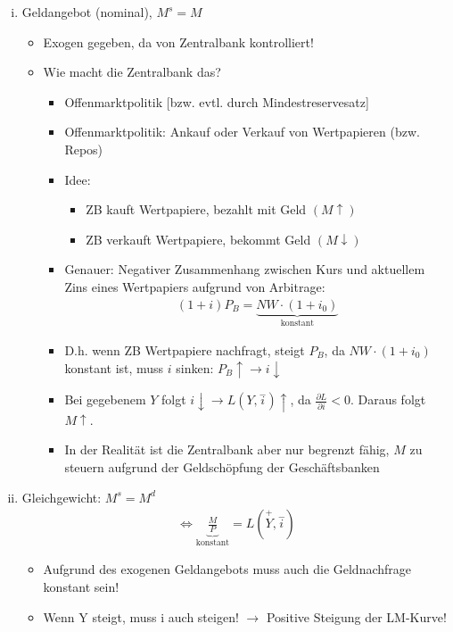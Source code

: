 \documentclass{scrartcl}
\begin{document}
\begin{enumerate}[(a)]
\begin{enumerate}[(i)]
    \item Geldangebot (nominal), $M^s=M$
    \begin{itemize}
      \item Exogen gegeben, da von Zentralbank kontrolliert!
      \item Wie macht die Zentralbank das?
      \begin{itemize}
      \item Offenmarktpolitik [bzw. evtl. durch Mindestreservesatz]
      \item Offenmarktpolitik: Ankauf oder Verkauf von Wertpapieren (bzw. Repos)
      \item Idee:
      \begin{itemize}
        \item ZB kauft Wertpapiere, bezahlt mit Geld $(M\uparrow)$
        \item ZB verkauft Wertpapiere, bekommt Geld $(M\downarrow)$
      \end{itemize}
      \item Genauer: Negativer Zusammenhang zwischen Kurs und aktuellem Zins eines Wertpapiers aufgrund von Arbitrage:
      \begin{align*}
        (1+i)P_B = \underbrace{NW\cdot(1+i_0)}_\text{konstant}
      \end{align*}
      \item D.h. wenn ZB Wertpapiere nachfragt, steigt $P_B$, da $NW\cdot(1+i_0)$ konstant ist, muss $i$ sinken: $P_B\uparrow \rightarrow i \downarrow$
      \item Bei gegebenem $Y$ folgt $i\downarrow \rightarrow L(Y,\overset{-}{i})\uparrow$, da $\frac{\partial L}{\partial i}<0$. Daraus folgt $M\uparrow$.
      \item In der Realit\"{a}t ist die Zentralbank aber nur begrenzt f\"{a}hig, $M$ zu steuern aufgrund der Geldsch\"{o}pfung der Gesch\"{a}ftsbanken
      \end{itemize}
    \end{itemize}
    \item Gleichgewicht: $M^s=M^d $
    \begin{align*}
      \Leftrightarrow \underbrace{\frac{M}{P}}_\text{konstant}=L(\overset{+}{Y},\overset{-}{i})
    \end{align*}
    \begin{itemize}
      \item Aufgrund des exogenen Geldangebots muss auch die Geldnachfrage konstant sein!
      \item Wenn Y steigt, muss i auch steigen! $\rightarrow$ Positive Steigung der LM-Kurve!

\end{itemize}
\end{enumerate}
\end{enumerate}
\end{document}
